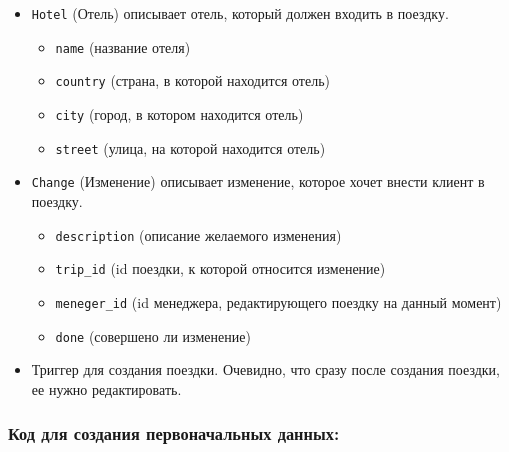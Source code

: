 \documentclass[a4paper,12pt]{article}
\begin{document}
\begin{itemize}
    \item \texttt{Hotel} (Отель) описывает отель, который должен входить в поездку.
          \begin{itemize}
              \item \texttt{name} (название отеля)
              \item \texttt{country} (страна, в которой находится отель)
              \item \texttt{city} (город, в котором находится отель)
              \item \texttt{street} (улица, на которой находится отель)
          \end{itemize}



    \item \texttt{Change} (Изменение) описывает изменение, которое хочет внести клиент в поездку.
          \begin{itemize}
              \item \texttt{description} (описание желаемого изменения)
              \item \texttt{trip\_id} (id поездки, к которой относится изменение)
              \item \texttt{meneger\_id} (id менеджера, редактирующего поездку на данный момент)
              \item \texttt{done} (совершено ли изменение)
          \end{itemize}



    \item Триггер для создания поездки. Очевидно, что сразу после создания поездки, ее нужно редактировать.


\end{itemize}

\subsubsection{Код для создания первоначальных данных:}
\end{document}
